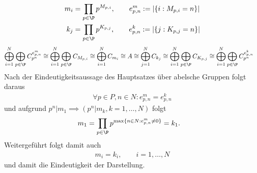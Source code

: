 \begin{solution}
\begin{align*}
  m_i &= \prod_{p \in \P}p^{M_{p,i}}, \qquad e^m_{p,n} := |\{i: M_{p,i} = n\}| \\
  k_j &= \prod_{p \in \P} p^{K_{p,j}}, \qquad e^k_{p,n} := |\{j: K_{p,j} = n\}|
\end{align*}
\begin{align*}
\bigoplus_{i = 1}^{N}\bigoplus_{p \in \P}C_{p^n}^{e^m_{p,n}} &\cong
\bigoplus_{i = 1}^{N}\bigoplus_{p \in \P}C_{M_{p,i}} \cong
\bigoplus_{i = 1}^{N} C_{m_i} \cong A \cong \bigoplus_{j = 1}^{N} C_{k_j}
\cong \bigoplus_{i = 1}^{N}\bigoplus_{p \in \P}C_{K_{p,j}}
\cong \bigoplus_{i = 1}^{N}\bigoplus_{p \in \P}C_{p^n}^{e^k_{p,n}}
\end{align*}
Nach der Eindeutigkeitsaussage des Hauptsatzes über abelsche Gruppen folgt daraus
\begin{align*}
  \forall p \in P, n \in N: e^m_{p,n} = e^k_{p,n}
\end{align*}
und aufgrund $p^n | m_1 \implies (p^n | m_k, k = 1,\dots,N)$ folgt
\begin{align*}
  m_1 &= \prod_{p \in \P}p^{\max\{n \in N: e^m_{p,n} \neq 0\}} = k_1.
\end{align*}
Weitergeführt folgt damit auch
\begin{align*}
  m_i = k_i, \qquad i = 1,\dots,N
\end{align*}
und damit die Eindeutigkeit der Darstellung.
\end{solution}
